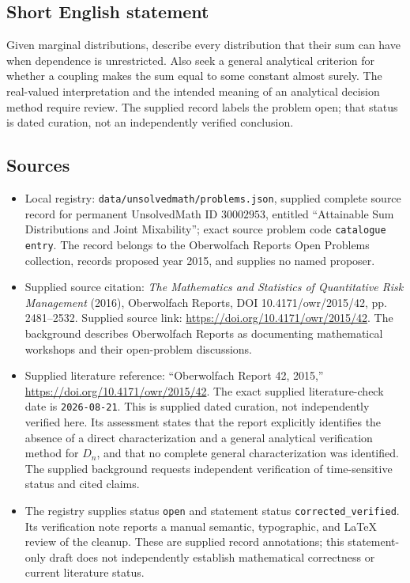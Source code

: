 \documentclass[11pt]{article}
\begin{document}
\subsection{Short English statement}
Given marginal distributions, describe every distribution that their sum can have when dependence is unrestricted. Also seek a general analytical criterion for whether a coupling makes the sum equal to some constant almost surely. The real-valued interpretation and the intended meaning of an analytical decision method require review. The supplied record labels the problem open; that status is dated curation, not an independently verified conclusion.
\subsection{Sources}
\begin{itemize}
\item Local registry: \texttt{data/unsolvedmath/problems.json}, supplied complete source record for permanent UnsolvedMath ID \(30002953\), entitled ``Attainable Sum Distributions and Joint Mixability''; exact source problem code \texttt{catalogue entry}. The record belongs to the Oberwolfach Reports Open Problems collection, records proposed year 2015, and supplies no named proposer.
\item Supplied source citation: \emph{The Mathematics and Statistics of Quantitative Risk Management} (2016), Oberwolfach Reports, DOI 10.4171/owr/2015/42, pp. 2481--2532. Supplied source link: \url{https://doi.org/10.4171/owr/2015/42}. The background describes Oberwolfach Reports as documenting mathematical workshops and their open-problem discussions.
\item Supplied literature reference: ``Oberwolfach Report 42, 2015,'' \url{https://doi.org/10.4171/owr/2015/42}. The exact supplied literature-check date is \texttt{2026-08-21}. This is supplied dated curation, not independently verified here. Its assessment states that the report explicitly identifies the absence of a direct characterization and a general analytical verification method for \(D_n\), and that no complete general characterization was identified. The supplied background requests independent verification of time-sensitive status and cited claims.
\item The registry supplies status \texttt{open} and statement status \texttt{corrected\_verified}. Its verification note reports a manual semantic, typographic, and LaTeX review of the cleanup. These are supplied record annotations; this statement-only draft does not independently establish mathematical correctness or current literature status.
\end{itemize}
\end{document}
